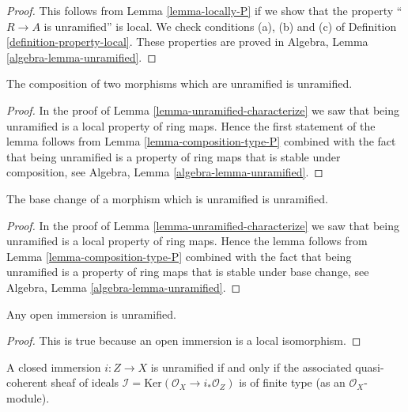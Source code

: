 \begin{proof}
This follows from Lemma \ref{lemma-locally-P} if we show that
the property ``$R \to A$ is unramified'' is local.
We check conditions (a), (b) and (c) of Definition
\ref{definition-property-local}.
These properties are proved in
Algebra, Lemma \ref{algebra-lemma-unramified}.
\end{proof}

\begin{lemma}
\label{lemma-composition-unramified}
The composition of two morphisms which are unramified is unramified.
\end{lemma}

\begin{proof}
In the proof of Lemma \ref{lemma-unramified-characterize}
we saw that being unramified is a local property of ring maps.
Hence the first statement of the lemma follows from
Lemma \ref{lemma-composition-type-P} combined
with the fact that being unramified is a property of ring maps that is
stable under composition, see
Algebra, Lemma \ref{algebra-lemma-unramified}.
\end{proof}

\begin{lemma}
\label{lemma-base-change-unramified}
The base change of a morphism which is unramified is unramified.
\end{lemma}

\begin{proof}
In the proof of Lemma \ref{lemma-unramified-characterize}
we saw that being unramified is a local property of ring maps.
Hence the lemma follows from
Lemma \ref{lemma-composition-type-P} combined
with the fact that being unramified is a property of ring maps that is
stable under base change, see
Algebra, Lemma \ref{algebra-lemma-unramified}.
\end{proof}

\begin{lemma}
\label{lemma-open-immersion-unramified}
Any open immersion is unramified.
\end{lemma}

\begin{proof}
This is true because an open immersion is a local isomorphism.
\end{proof}

\begin{lemma}
\label{lemma-closed-immersion-unramified}
A closed immersion $i : Z \to X$ is unramified if and only if
the associated quasi-coherent sheaf of ideals
$\mathcal{I} = \text{Ker}(\mathcal{O}_X \to i_*\mathcal{O}_Z)$
is of finite type (as an $\mathcal{O}_X$-module).
\end{lemma}


